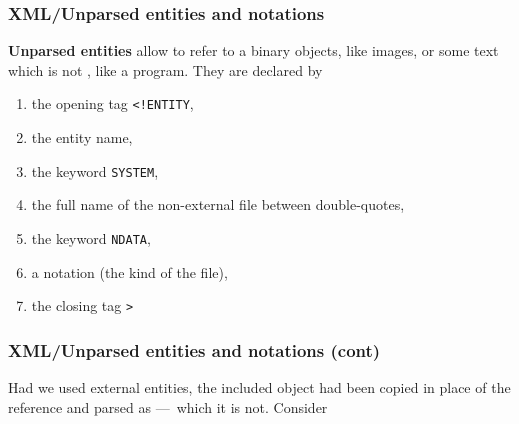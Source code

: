 %
\begin{frame}[containsverbatim]
\frametitle{XML/Unparsed entities and notations}

\textbf{Unparsed entities} allow to refer to a binary objects, like
images, or some text which is not \XML, like a program. They are
declared by
\begin{enumerate}

  \item the opening tag \verb|<!ENTITY|,

  \item the entity name,

  \item the keyword \verb|SYSTEM|,

  \item the full name of the non-\XML external file between
    double-quotes,

  \item the keyword \verb|NDATA|,

  \item a notation (the kind of the file),

  \item the closing tag \verb|>|

\end{enumerate}

\end{frame}

%
\begin{frame}
\frametitle{XML/Unparsed entities and notations (cont)}

Had we used external entities, the included object had been copied in
place of the reference and parsed as \XML{} ---~which it is
not. Consider

\end{frame}

